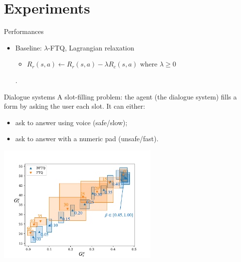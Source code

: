 \documentclass[slideopt,A4,showboxes,svgnames]{beamer}
\begin{document}
\section{Experiments}
\frame{\sectionpage}

\begin{frame}{Performances}
\begin{itemize}
	\item Baseline: $\lambda$-FTQ, Lagrangian relaxation
	\begin{itemize}
		\item $R_r(s,a) \leftarrow R_r(s,a) - \lambda R_c(s,a) \text{ where } \lambda \geq 0$
	\end{itemize}.
\end{itemize}
\end{frame}

\begin{frame}{Dialogue systems}
A slot-filling problem: the agent (the dialogue system) fills a form by asking the user each slot. It can either:
\begin{itemize}
	\item ask to answer using {\green voice} {\green (safe/slow)};
	\item ask to answer with a {\red numeric pad} {\red (unsafe/fast)}.
\end{itemize}


\begin{center}
	\includegraphics[trim={0 0.1cm 0 0.8cm}, clip, width=0.6\textwidth]{../../source/img/slot-filling.pdf}
\end{center}
\end{frame}
\end{document}
